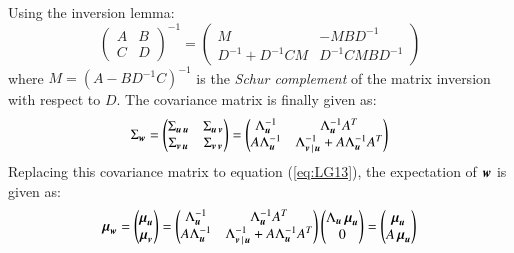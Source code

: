 Using the inversion lemma:
\begin{equation}
	\left(\begin{matrix} A & B \\ C & D \end{matrix}\right)^{-1}= \left(\begin{matrix}M & -MBD^{-1} \\ D^{-1}+D^{-1}CM & D^{-1}CMBD^{-1}\end{matrix}\right)
\label{eq:LG14}
\end{equation}
where $ M=(A-BD^{-1}C)^{-1} $ is the \textit{Schur complement} of the matrix inversion with respect to $ D $. The covariance matrix is finally given as:
\begin{equation}
	\Sigma_{\operatorname{\boldsymbol{w}}}= \left(\begin{matrix}\Sigma_{\operatorname{\boldsymbol{u}}\operatorname{\boldsymbol{u}}} & \Sigma_{\operatorname{\boldsymbol{u}}\operatorname{\boldsymbol{v}}} \\ \Sigma_{\operatorname{\boldsymbol{v}}\operatorname{\boldsymbol{u}}} & \Sigma_{\operatorname{\boldsymbol{v}}\operatorname{\boldsymbol{v}}}\end{matrix}\right) =\left(\begin{matrix}\Lambda^{-1}_{\operatorname{\boldsymbol{u}}} & \Lambda^{-1}_{\operatorname{\boldsymbol{u}}}A^T \\ A \Lambda^{-1}_{\operatorname{\boldsymbol{u}}} &\Lambda^{-1}_{\operatorname{\boldsymbol{v}}|\operatorname{\boldsymbol{u}}} + A\Lambda^{-1}_{\operatorname{\boldsymbol{u}}}A^T\end{matrix}\right)
\label{eq:LG15}
\end{equation}
Replacing this covariance matrix to equation (\ref{eq:LG13}), the expectation of $ \operatorname{\boldsymbol{w}} $ is given as:
\begin{equation}
	\operatorname{\boldsymbol{\mu}}_{\operatorname{\boldsymbol{w}}} = \left(\begin{matrix}\operatorname{\boldsymbol{\mu}}_{\operatorname{\boldsymbol{u}}} \\ \operatorname{\boldsymbol{\mu}}_{\operatorname{\boldsymbol{v}}} \end{matrix}\right) =\left(\begin{matrix}\Lambda^{-1}_{\operatorname{\boldsymbol{u}}} & \Lambda^{-1}_{\operatorname{\boldsymbol{u}}}A^T \\ A \Lambda^{-1}_{\operatorname{\boldsymbol{u}}} & \Lambda^{-1}_{\operatorname{\boldsymbol{v}}|\operatorname{\boldsymbol{u}}} + A\Lambda^{-1}_{\operatorname{\boldsymbol{u}}}A^T\end{matrix}\right) \left(\begin{matrix}\Lambda_{\operatorname{\boldsymbol{u}}}\operatorname{\boldsymbol{\mu}}_{\operatorname{\boldsymbol{u}}} \\ 0 \end{matrix}\right) = \left(\begin{matrix}\operatorname{\boldsymbol{\mu}}_{\operatorname{\boldsymbol{u}}} \\ A\operatorname{\boldsymbol{\mu}}_{\operatorname{\boldsymbol{u}}} \end{matrix}\right)
\label{eq:LG16} 
\end{equation}

